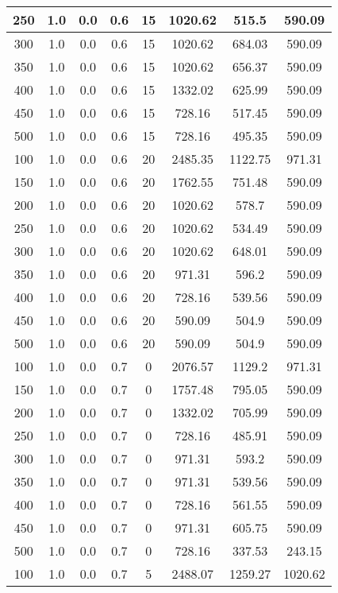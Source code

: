 \documentclass[a4paper, 12pt]{extreport}
\begin{document}
\begin{itemize}
\begin{longtable}{|c|c|c|c|c|c|c|c|}
			250 & 1.0 & 0.0 & 0.6 & 15 & 1020.62 & 515.5 & 590.09 \\\hline
			300 & 1.0 & 0.0 & 0.6 & 15 & 1020.62 & 684.03 & 590.09 \\\hline
			350 & 1.0 & 0.0 & 0.6 & 15 & 1020.62 & 656.37 & 590.09 \\\hline
			400 & 1.0 & 0.0 & 0.6 & 15 & 1332.02 & 625.99 & 590.09 \\\hline
			450 & 1.0 & 0.0 & 0.6 & 15 & 728.16 & 517.45 & 590.09 \\\hline
			500 & 1.0 & 0.0 & 0.6 & 15 & 728.16 & 495.35 & 590.09 \\\hline
			100 & 1.0 & 0.0 & 0.6 & 20 & 2485.35 & 1122.75 & 971.31 \\\hline
			150 & 1.0 & 0.0 & 0.6 & 20 & 1762.55 & 751.48 & 590.09 \\\hline
			200 & 1.0 & 0.0 & 0.6 & 20 & 1020.62 & 578.7 & 590.09 \\\hline
			250 & 1.0 & 0.0 & 0.6 & 20 & 1020.62 & 534.49 & 590.09 \\\hline
			300 & 1.0 & 0.0 & 0.6 & 20 & 1020.62 & 648.01 & 590.09 \\\hline
			350 & 1.0 & 0.0 & 0.6 & 20 & 971.31 & 596.2 & 590.09 \\\hline
			400 & 1.0 & 0.0 & 0.6 & 20 & 728.16 & 539.56 & 590.09 \\\hline
			450 & 1.0 & 0.0 & 0.6 & 20 & 590.09 & 504.9 & 590.09 \\\hline
			500 & 1.0 & 0.0 & 0.6 & 20 & 590.09 & 504.9 & 590.09 \\\hline
			100 & 1.0 & 0.0 & 0.7 & 0 & 2076.57 & 1129.2 & 971.31 \\\hline
			150 & 1.0 & 0.0 & 0.7 & 0 & 1757.48 & 795.05 & 590.09 \\\hline
			200 & 1.0 & 0.0 & 0.7 & 0 & 1332.02 & 705.99 & 590.09 \\\hline
			250 & 1.0 & 0.0 & 0.7 & 0 & 728.16 & 485.91 & 590.09 \\\hline
			300 & 1.0 & 0.0 & 0.7 & 0 & 971.31 & 593.2 & 590.09 \\\hline
			350 & 1.0 & 0.0 & 0.7 & 0 & 971.31 & 539.56 & 590.09 \\\hline
			400 & 1.0 & 0.0 & 0.7 & 0 & 728.16 & 561.55 & 590.09 \\\hline
			450 & 1.0 & 0.0 & 0.7 & 0 & 971.31 & 605.75 & 590.09 \\\hline
			500 & 1.0 & 0.0 & 0.7 & 0 & 728.16 & 337.53 & 243.15 \\\hline
			100 & 1.0 & 0.0 & 0.7 & 5 & 2488.07 & 1259.27 & 1020.62 \\\hline

\end{longtable}
\end{itemize}
\end{document}
